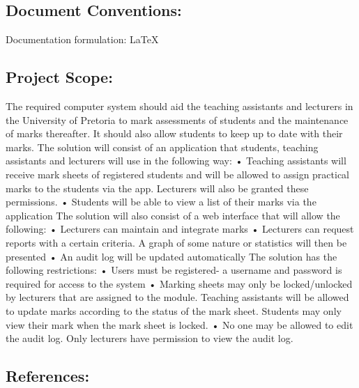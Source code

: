\documentclass[12pt]{article}
\begin{document}
	\vspace{0.2in}
	
		\subsection{Document Conventions:} %
		\vspace{0.1in}
		Documentation formulation: LaTeX
	
	\vspace{0.2in}
	
		\subsection{Project Scope:} %
		\vspace{0.1in}
		The required computer system should aid the teaching assistants and lecturers in the University of Pretoria to mark assessments of students and the maintenance of marks thereafter. It should also allow students to keep up to date with their marks.
		The solution will consist of an application that students, teaching assistants and lecturers will use in the following way:
		•	Teaching assistants will receive mark sheets of registered students and will be allowed to assign practical marks to the students via the app. Lecturers will also be granted these permissions.
		•	Students will be able to view a list of their marks via the application
		The solution will also consist of a web interface that will allow the following:
		•	Lecturers can maintain and integrate marks
		•	Lecturers can request reports with a certain criteria. A graph of some nature or statistics will then be presented 
		•	An audit log will be updated automatically 
		The solution has the following restrictions:
		•	Users must be registered- a username and password is required for access to the system
		•	Marking sheets may only be locked/unlocked by lecturers that are assigned to the module. Teaching assistants will be allowed to update marks according to the status of the mark sheet. Students may only view their mark when the mark sheet is locked.
		•	No one may be allowed to edit the audit log. Only lecturers have permission to view the audit log.
		
		
	
	\vspace{0.2in}
	
		\subsection{References:}
		\vspace{0.1in}
			
\end{document}
